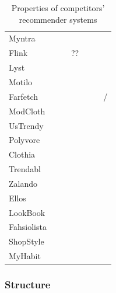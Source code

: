 \documentclass{beamer}
\newcommand{\cmark}{\color{ForestGreen}\ding{52}} %
\newcommand{\xmark}{\color{RedOrange}\ding{55}}   %
\begin{document}
\begin{frame}
\begin{table}[H]
{\begin{tabular}{lllllll}
                Myntra  & \cmark & \cmark & \cmark & \cmark & \xmark & \xmark \\
                Flink   & \xmark & \cmark & ?? & \cmark & \cmark & \xmark \\
                Lyst    & \xmark & \cmark & \cmark & \cmark & \cmark & \xmark \\
                Motilo  & \xmark & \cmark & \xmark & \cmark & \cmark & \xmark \\
                Farfetch & \cmark & \cmark & \cmark & \cmark & \xmark & \xmark/\cmark \\
                ModCloth  & \cmark & \cmark & \cmark & \cmark & \xmark & \xmark \\
                UsTrendy  & \cmark & \cmark & \cmark & \cmark & \xmark & \xmark \\
                Polyvore  & \xmark & \cmark & \cmark & \cmark & \cmark & \xmark \\
                Clothia  & \xmark & \cmark & \cmark & \cmark & \cmark & \xmark \\
                Trendabl  & \cmark & \cmark & \cmark & \cmark & \cmark & \xmark \\
                Zalando  & \cmark & \cmark & \cmark & \cmark & \xmark & \xmark \\
                Ellos  & \cmark & \cmark & \cmark & \cmark & \xmark & \xmark \\
                LookBook  & \xmark & \cmark & \cmark & \cmark & \cmark & \xmark \\
                Fahsiolista  & \xmark & \cmark & \xmark & \cmark & \cmark & \xmark \\
                ShopStyle  & \xmark & \xmark & \cmark & \cmark & \xmark & \xmark \\
                MyHabit  & \cmark & \xmark & \cmark & \xmark & \xmark & \xmark \\
                \bottomrule
            \end{tabular}
          }
          \caption{Properties of competitors' recommender systems}
      \end{table}
  \end{frame}

  \begin{frame}
    \frametitle{Structure}
    \tableofcontents
  \end{frame}

\end{document}
